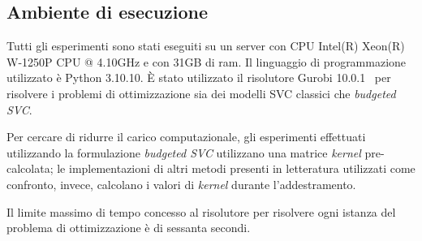 \subsection{Ambiente di esecuzione}
Tutti gli esperimenti sono stati eseguiti su un server con CPU Intel(R) Xeon(R) W-1250P CPU @ 4.10GHz e con 31GB di ram. Il linguaggio di programmazione utilizzato è Python 3.10.10. \`E stato utilizzato il risolutore Gurobi 10.0.1~\cite{gurobi} per risolvere i problemi di ottimizzazione sia dei modelli SVC classici che \emph{budgeted SVC}.

Per cercare di ridurre il carico computazionale, gli esperimenti effettuati utilizzando la formulazione \emph{budgeted SVC} utilizzano una matrice \emph{kernel} pre-calcolata; le implementazioni di altri metodi presenti in letteratura utilizzati come confronto, invece, calcolano i valori di \emph{kernel} durante l'addestramento.

Il limite massimo di tempo concesso al risolutore per risolvere ogni istanza del problema di ottimizzazione è di sessanta secondi.

